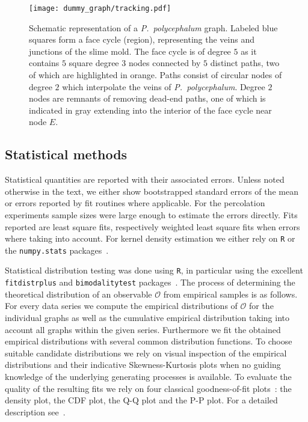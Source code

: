 		\begin{figure}[!htbp]
			\centering
			
			\texttt{[image: dummy\_graph/tracking.pdf]}

			\caption[Schematic representation of a \P graph.]{Schematic representation of a \emph{P.~polycephalum} graph. Labeled blue squares form a face cycle (region), representing the veins and junctions of the slime mold. The face cycle is of degree $5$ as it contains $5$ square degree $3$ nodes connected by $5$ distinct paths, two of which are highlighted in orange. Paths consist of circular nodes of degree $2$ which interpolate the veins of \emph{P.~polycephalum}. Degree $2$ nodes are remnants of removing dead-end paths, one of which is indicated in gray extending into the interior of the face cycle near node $E$.}
			\label{fig:graph_schematic}
		\end{figure}

	\subsection{Statistical methods}

		Statistical quantities are reported with their associated errors. Unless noted otherwise in the text, we either show bootstrapped standard errors of the mean or errors reported by fit routines where applicable. For the percolation experiments sample sizes were large enough to estimate the errors directly. Fits reported are least square fits, respectively weighted least square fits when errors where taking into account. For kernel density estimation we either rely on \verb+R+ or the \verb+numpy.stats+ packages~\cite{team2013r,jones2001open}.

		Statistical distribution testing was done using \verb+R+, in particular using the excellent \verb+fitdistrplus+ and \verb+bimodalitytest+ packages~\cite{delignette2015fitdistrplus}. The process of determining the theoretical distribution of an observable $\mathcal{O}$ from empirical samples is as follows. For every data series we compute the empirical distributions of $\mathcal{O}$ for the individual graphs as well as the cumulative empirical distribution taking into account all graphs within the given series. Furthermore we fit the obtained empirical distributions with several common distribution functions. To choose suitable candidate distributions we rely on visual inspection of the empirical distributions and their indicative Skewness-Kurtosis plots when no guiding knowledge of the underlying generating processes is available. To evaluate the quality of the resulting fits we rely on four classical goodness-of-fit plots~\cite{cullen1999probabilistic}: the density plot, the CDF plot, the Q-Q plot and the P-P plot. For a detailed description see~\cite{delignette2015fitdistrplus}.
		
